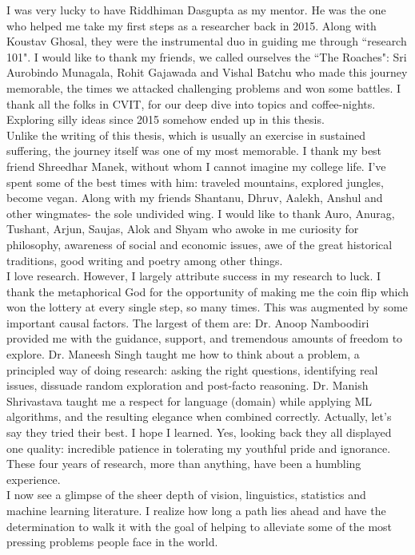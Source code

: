 \noindent I was very lucky to have Riddhiman Dasgupta as my mentor. He was the one who helped me take my first steps as a researcher back in 2015. Along with Koustav Ghosal, they were the instrumental duo in guiding me through ``research 101". I would like to thank my friends, we called ourselves the ``The Roaches": Sri Aurobindo Munagala, Rohit Gajawada and Vishal Batchu who made this journey memorable, the times we attacked challenging problems and won some battles. I thank all the folks in CVIT, for our deep dive into topics and coffee-nights. Exploring silly ideas since 2015 somehow ended up in this thesis.\\

\noindent Unlike the writing of this thesis, which is usually an exercise in sustained suffering, the journey itself was one of my most memorable. I thank my best friend Shreedhar Manek, without whom I cannot imagine my college life. I've spent some of the best times with him: traveled mountains, explored jungles, become vegan. Along with my friends Shantanu, Dhruv, Aalekh, Anshul and other wingmates- the sole undivided wing. I would like to thank Auro, Anurag, Tushant, Arjun, Saujas, Alok and Shyam who awoke in me curiosity for philosophy, awareness of social and economic issues, awe of the great historical traditions, good writing and poetry among other things.\\

\noindent I love research. However, I largely attribute success in my research to luck. I thank the metaphorical God for the opportunity of making me the coin flip which won the lottery at every single step, so many times. This was augmented by some important causal factors. The largest of them are: Dr. Anoop Namboodiri provided me with the guidance, support, and tremendous amounts of freedom to explore. Dr. Maneesh Singh taught me how to think about a problem, a principled way of doing research: asking the right questions, identifying real issues, dissuade random exploration and post-facto reasoning. Dr. Manish Shrivastava taught me a respect for language (domain) while applying ML algorithms, and the resulting elegance when combined correctly. Actually, let's say they tried their best. I hope I learned. Yes, looking back they all displayed one quality: incredible patience in tolerating my youthful pride and ignorance. These four years of research, more than anything, have been a humbling experience. \\

\noindent I now see a glimpse of the sheer depth of vision, linguistics, statistics and machine learning literature. I realize how long a path lies ahead and have the determination to walk it with the goal of helping to alleviate some of the most pressing problems people face in the world. 
